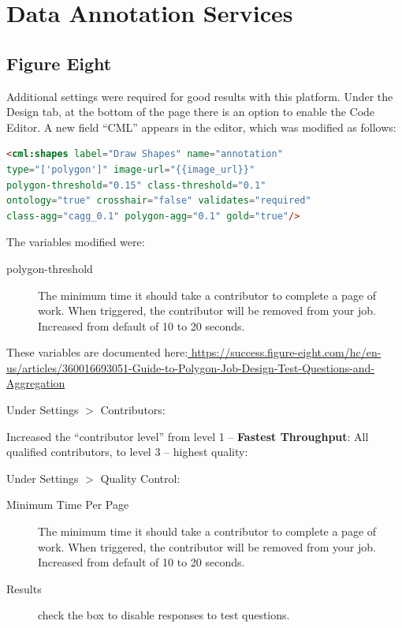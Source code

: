 \documentclass[11pt]{article} %
\begin{document}
\clearpage


\clearpage

\appendix

\section{Data Annotation Services}

\subsection{Figure Eight}
\label{sec:figure-eight}

Additional settings were required for good results with this platform. 
Under the Design tab, at the bottom of the page there is an option to enable 
the Code Editor. A new field ``CML'' appears in the editor, which was modified 
as follows:

\begin{lstlisting}[language=html, frame=single]
<cml:shapes label="Draw Shapes" name="annotation" 
type="['polygon']" image-url="{{image_url}}" 
polygon-threshold="0.15" class-threshold="0.1" 
ontology="true" crosshair="false" validates="required" 
class-agg="cagg_0.1" polygon-agg="0.1" gold="true"/>
\end{lstlisting}

The variables modified were: 

\begin{description}
\item[polygon-threshold] The minimum time it should take a contributor to
complete a page of work. When triggered, the contributor will be removed from
your job. Increased from default of 10 to 20 seconds.
\end{description}

These variables are documented here:\url{ 
https://success.figure-eight.com/hc/en-us/articles/360016693051-Guide-to-Polygon-Job-Design-Test-Questions-and-Aggregation}

Under Settings $>$ Contributors:

Increased the ``contributor level'' from level 1 -- \textbf{Fastest
Throughput}: All qualified contributors, to level 3 -- highest quality: 

Under Settings $>$ Quality Control:

\begin{description}
\item[Minimum Time Per Page] The minimum time it should take a contributor to
complete a page of work. When triggered, the contributor will be removed from
your job. Increased from default of 10 to 20 seconds.

\item[Results] check the box to disable responses to test questions.
\end{description}
\end{document}
